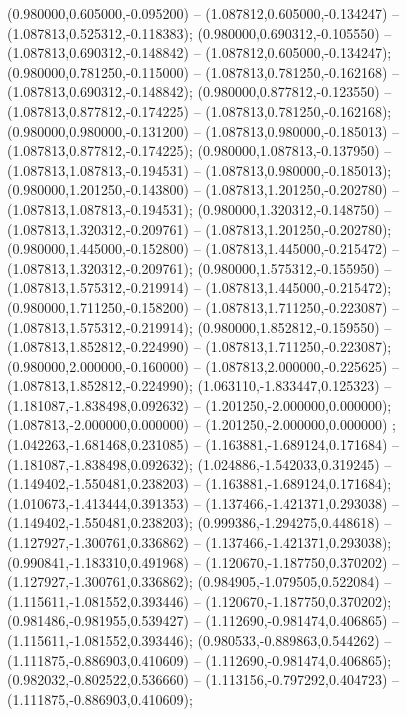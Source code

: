  (0.980000,0.605000,-0.095200) -- (1.087812,0.605000,-0.134247) -- (1.087813,0.525312,-0.118383);
 (0.980000,0.690312,-0.105550) -- (1.087813,0.690312,-0.148842) -- (1.087812,0.605000,-0.134247);
 (0.980000,0.781250,-0.115000) -- (1.087813,0.781250,-0.162168) -- (1.087813,0.690312,-0.148842);
 (0.980000,0.877812,-0.123550) -- (1.087813,0.877812,-0.174225) -- (1.087813,0.781250,-0.162168);
 (0.980000,0.980000,-0.131200) -- (1.087813,0.980000,-0.185013) -- (1.087813,0.877812,-0.174225);
 (0.980000,1.087813,-0.137950) -- (1.087813,1.087813,-0.194531) -- (1.087813,0.980000,-0.185013);
 (0.980000,1.201250,-0.143800) -- (1.087813,1.201250,-0.202780) -- (1.087813,1.087813,-0.194531);
 (0.980000,1.320312,-0.148750) -- (1.087813,1.320312,-0.209761) -- (1.087813,1.201250,-0.202780);
 (0.980000,1.445000,-0.152800) -- (1.087813,1.445000,-0.215472) -- (1.087813,1.320312,-0.209761);
 (0.980000,1.575312,-0.155950) -- (1.087813,1.575312,-0.219914) -- (1.087813,1.445000,-0.215472);
 (0.980000,1.711250,-0.158200) -- (1.087813,1.711250,-0.223087) -- (1.087813,1.575312,-0.219914);
 (0.980000,1.852812,-0.159550) -- (1.087813,1.852812,-0.224990) -- (1.087813,1.711250,-0.223087);
 (0.980000,2.000000,-0.160000) -- (1.087813,2.000000,-0.225625) -- (1.087813,1.852812,-0.224990);
 (1.063110,-1.833447,0.125323) -- (1.181087,-1.838498,0.092632) -- (1.201250,-2.000000,0.000000);
 (1.087813,-2.000000,0.000000) -- (1.201250,-2.000000,0.000000) ;
 (1.042263,-1.681468,0.231085) -- (1.163881,-1.689124,0.171684) -- (1.181087,-1.838498,0.092632);
 (1.024886,-1.542033,0.319245) -- (1.149402,-1.550481,0.238203) -- (1.163881,-1.689124,0.171684);
 (1.010673,-1.413444,0.391353) -- (1.137466,-1.421371,0.293038) -- (1.149402,-1.550481,0.238203);
 (0.999386,-1.294275,0.448618) -- (1.127927,-1.300761,0.336862) -- (1.137466,-1.421371,0.293038);
 (0.990841,-1.183310,0.491968) -- (1.120670,-1.187750,0.370202) -- (1.127927,-1.300761,0.336862);
 (0.984905,-1.079505,0.522084) -- (1.115611,-1.081552,0.393446) -- (1.120670,-1.187750,0.370202);
 (0.981486,-0.981955,0.539427) -- (1.112690,-0.981474,0.406865) -- (1.115611,-1.081552,0.393446);
 (0.980533,-0.889863,0.544262) -- (1.111875,-0.886903,0.410609) -- (1.112690,-0.981474,0.406865);
 (0.982032,-0.802522,0.536660) -- (1.113156,-0.797292,0.404723) -- (1.111875,-0.886903,0.410609);
